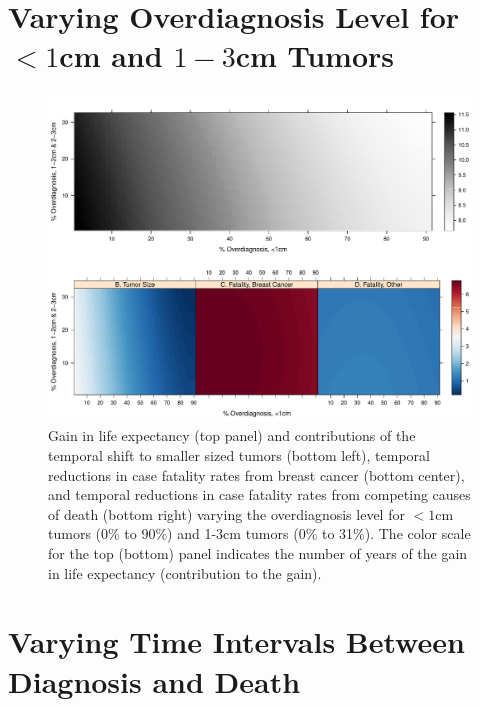 \documentclass[11pt,letterpaper]{article}
\theoremstyle{plain}
\theoremstyle{remark}
\numberwithin{equation}{section}
\begin{document}
\section{Varying Overdiagnosis Level for $<1$cm and $1-3$cm Tumors}
\begin{figure}[h]
\begin{center}
\includegraphics[width=\linewidth]{appendix_figure2}
\caption{Gain in life expectancy (top panel) and
  contributions of the temporal shift to smaller sized tumors (bottom
  left), temporal reductions in case fatality rates from breast cancer
  (bottom center), and temporal reductions in case fatality rates from
  competing causes of death (bottom right) varying the overdiagnosis
  level for $<1$cm tumors (0\% to 90\%) and 1-3cm tumors (0\% to
  31\%).  The color scale for the top (bottom) panel indicates the
number of years of the gain in life expectancy (contribution to the gain).}
\label{fig:figure2}
\end{center}
\end{figure}

\newpage
\section{Varying Time Intervals Between Diagnosis and Death}
\end{document}
